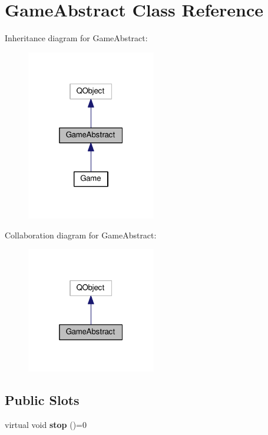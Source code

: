 \hypertarget{classGameAbstract}{}\section{Game\+Abstract Class Reference}
\label{classGameAbstract}


Inheritance diagram for Game\+Abstract\+:
\nopagebreak
\begin{figure}[H]
\begin{center}
\leavevmode
\includegraphics[width=160pt]{classGameAbstract__inherit__graph}
\end{center}
\end{figure}


Collaboration diagram for Game\+Abstract\+:
\nopagebreak
\begin{figure}[H]
\begin{center}
\leavevmode
\includegraphics[width=160pt]{classGameAbstract__coll__graph}
\end{center}
\end{figure}
\subsection*{Public Slots}
\begin{DoxyCompactItemize}
\item 
\mbox{\label{classGameAbstract_a053f172166edf5e72d80c3266b2b9bfe}} 
virtual void {\bfseries stop} ()=0
\end{DoxyCompactItemize}
